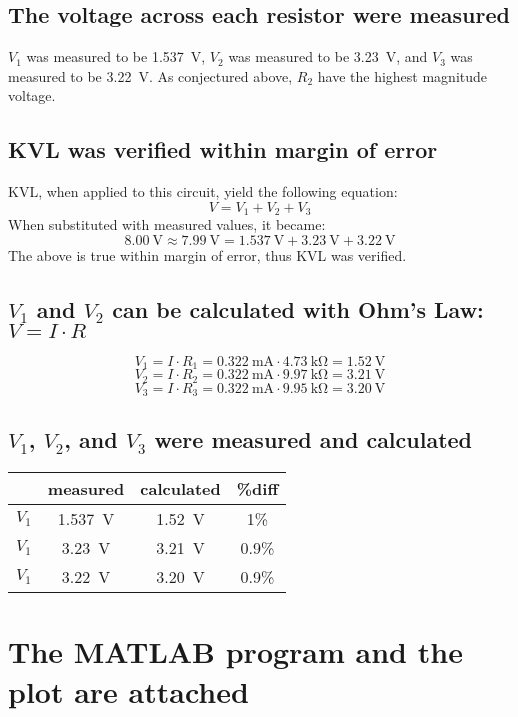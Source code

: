 \documentclass{article}
\begin{document}
\subsection{The voltage across each resistor were measured}
$V_1$ was measured to be \SI{1.537}{\volt}, $V_2$ was measured to be \SI{3.23}{\volt}, and $V_3$ was measured to be \SI{3.22}{\volt}. As conjectured above, $R_2$ have the highest magnitude voltage.

\subsection{KVL was verified within margin of error}
KVL, when applied to this circuit, yield the following equation:
\[V=V_1+V_2+V_3\]
When substituted with measured values, it became:
\[\SI{8.00}{\volt}\approx\SI{7.99}{\volt}=\SI{1.537}{\volt}+\SI{3.23}{\volt}+\SI{3.22}{\volt}\]
The above is true within margin of error, thus KVL was verified.

\subsection{$V_1$ and $V_2$ can be calculated with Ohm's Law: $V=I\cdot R$}
\[ V_1 = I\cdot R_1 = \SI{0.322}{\milli\ampere}\cdot\SI{4.73}{\kilo\ohm}=\SI{1.52}{\volt} \]
\[ V_2 = I\cdot R_2 = \SI{0.322}{\milli\ampere}\cdot\SI{9.97}{\kilo\ohm}=\SI{3.21}{\volt} \]
\[ V_3 = I\cdot R_3 = \SI{0.322}{\milli\ampere}\cdot\SI{9.95}{\kilo\ohm}=\SI{3.20}{\volt} \]

\subsection{$V_1$, $V_2$, and $V_3$ were measured and calculated}
\begin{center}
    \begin{tabular}{|c|c c c|}
         \hline
         & measured & calculated & \%diff  \\
         \hline
         $V_1$ & \SI{1.537}{\volt} & \SI{1.52}{\volt} & 1\% \\
         $V_1$ & \SI{3.23}{\volt} & \SI{3.21}{\volt} & 0.9\% \\
         $V_1$ & \SI{3.22}{\volt} & \SI{3.20}{\volt} & 0.9\% \\
         \hline
    \end{tabular}
\end{center}

\section{The MATLAB program and the plot are attached}
\end{document}

